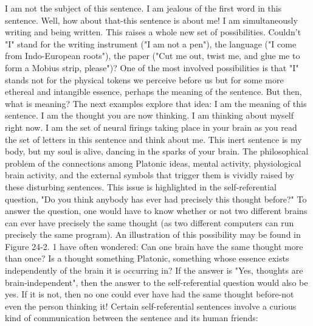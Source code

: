 I am not the subject of this sentence. 
I am jealous of the first word in this sentence. 
Well, how about that-this sentence is about me! 
I am simultaneously writing and being written. 
This raises a whole new set of possibilities. Couldn't "I" stand for the writing instrument ("I am not a pen"), the language ("I come from Indo-European roots"), the paper ("Cut me out, twist me, and glue me to form a Mobius strip, please")? One of the most involved possibilities is that "I" stands not for the physical tokens we perceive before us but for some more ethereal and intangible essence, perhaps the meaning of the sentence. But then, what is meaning? The next examples explore that idea: 
I am the meaning of this sentence. 
I am the thought you are now thinking. 
I am thinking about myself right now. 
I am the set of neural firings taking place in your brain as you read the set of letters in this sentence and think about me. 
This inert sentence is my body, but my soul is alive, dancing in the sparks of your brain. 
The philosophical problem of the connections among Platonic ideas, mental activity, physiological brain activity, and the external symbols that trigger them is vividly raised by these disturbing sentences. This issue is highlighted in the self-referential question, "Do you think anybody has ever had precisely this thought before?" To answer the question, one would have to know whether or not two different brains can ever have precisely the same thought (as two different computers can run precisely the same program). An illustration of this possibility may be found in Figure 24-2. 1 have often wondered: Can one brain have the same thought more than once? Is a thought something Platonic, something whose essence exists independently of the brain it is occurring in? If the answer is "Yes, thoughts are brain-independent", then the answer to the self-referential question would also be yes. If it is not, then no one could ever have had the same thought before-not even the person thinking it! Certain self-referential sentences involve a curious kind of communication between the sentence and its human friends: 



